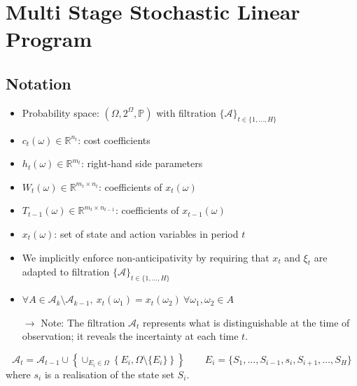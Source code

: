 \documentclass[12pt, openany]{report}
\newcommand{\R}{\mathbb{R}}
\renewcommand{\P}{\mathbb{P}}
\newcommand{\A}{\mathcal{A}}
\theoremstyle{definition}
\begin{document}
\section{Multi Stage Stochastic Linear Program}\label{sec:st}
\subsection{Notation}
\begin{itemize}
	\item Probability space: $(\Omega, 2^\Omega, \P)$ with filtration $\{\A\}_{t\in \{1, \dots, H\}}$
	\item $c_t(\omega) \in \R^{n_t}$: cost coefficients
	\item $h_t(\omega) \in \R^{m_t}$: right-hand side parameters
	\item $W_t(\omega) \in \R^{m_t \times n_t}$: coefficients of $x_t(\omega)$
	\item $T_{t-1}(\omega) \in \R^{m_t \times n_{t-1}}$: coefficients of $x_{t-1}(\omega)$
	\item $x_t(\omega)$: set of state and action variables in period $t$
	\item We implicitly enforce non-anticipativity by requiring that $x_t$ and $\xi_t$ are adapted to filtration $\{\mathcal{A}\}_{t\in \{1, \dots, H\}}$ 
	\item $\forall A \in \mathcal{A}_k \setminus \mathcal{A}_{k-1}, \: x_t(\omega_1)=x_t(\omega_2) \: \forall\omega_1,\omega_2 \in A$
	\item [$\to$] Note: The filtration $\mathcal{A}_t$ represents what is distinguishable at the time of observation; it reveals the incertainty at each time $t$. 
\end{itemize}
\begin{equation}
	\mathcal{A}_t = \mathcal{A}_{t-1}\cup \left\{\cup_{E_i\in \Omega}\left\{E_i, \Omega\setminus \{E_i\}\right\}\right\} \qquad E_i = \{S_1,\dots,S_{i-1},s_i,S_{i+1},\dots, S_H\}
\end{equation}
where $s_i$ is a realisation of the state set $S_i$.
\end{document}
